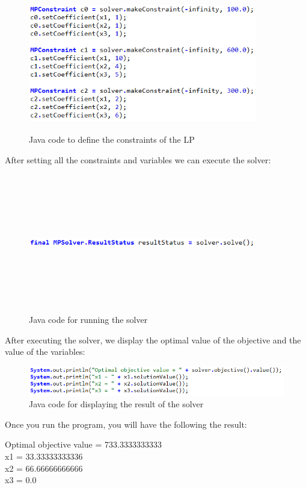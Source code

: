 \documentclass{report}
\begin{document}
\begin{figure}[H]
    	\centering
	\includegraphics[width=10cm,height=6cm,keepaspectratio]{lp-constraints.png}
	\caption{Java code to define the constraints of the LP}
\end{figure}
After setting all the constraints and variables we can execute the solver: \\
\begin{figure}[H]
    	\centering
	\includegraphics[width=10cm,height=6cm,keepaspectratio]{lp-solve.png}
	\caption{Java code for running the solver}
\end{figure}
After executing the solver, we display the optimal value of the objective and the value of the variables: \\
\begin{figure}[H]
    	\centering
	\includegraphics[width=\textwidth]{lp-result.png}
	\caption{Java code for displaying the result of the solver}
\end{figure}
Once you run the program, you will have the following the result: 
\begin{center}
Optimal objective value = 733.3333333333\\
x1 = 33.33333333336\\
x2 = 66.66666666666\\
x3 = 0.0\\
\end{center}
\end{document}
